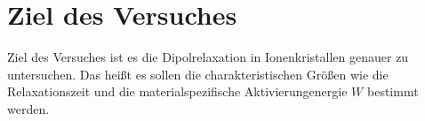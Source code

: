 \section{Ziel des Versuches}
\label{sec:Einleitung}
Ziel des Versuches ist es die Dipolrelaxation in Ionenkristallen genauer zu untersuchen.
Das heißt es sollen die charakteristischen Größen wie
die Relaxationszeit und die materialspezifische Aktivierungenergie $W$
bestimmt werden.
